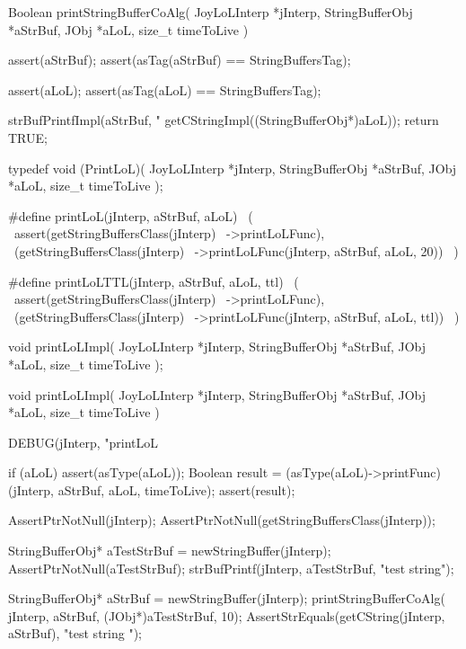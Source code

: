 \startCCode
Boolean printStringBufferCoAlg(
  JoyLoLInterp    *jInterp,
  StringBufferObj *aStrBuf,
  JObj            *aLoL,
  size_t           timeToLive
) {
  assert(aStrBuf);
  assert(asTag(aStrBuf) == StringBuffersTag);
  
  assert(aLoL);
  assert(asTag(aLoL) == StringBuffersTag);

  strBufPrintfImpl(aStrBuf, "%
    getCStringImpl((StringBufferObj*)aLoL));
  return TRUE;
}
\stopCCode

\startCHeader
typedef void (PrintLoL)(
  JoyLoLInterp    *jInterp,
  StringBufferObj *aStrBuf,
  JObj            *aLoL,
  size_t           timeToLive
);

#define printLoL(jInterp, aStrBuf, aLoL)          \ 
  (                                               \
    assert(getStringBuffersClass(jInterp)         \
      ->printLoLFunc),                            \
    (getStringBuffersClass(jInterp)               \
      ->printLoLFunc(jInterp, aStrBuf, aLoL, 20)) \
  )

#define printLoLTTL(jInterp, aStrBuf, aLoL, ttl)    \ 
  (                                                 \
    assert(getStringBuffersClass(jInterp)           \
      ->printLoLFunc),                              \
    (getStringBuffersClass(jInterp)                 \
      ->printLoLFunc(jInterp, aStrBuf, aLoL, ttl))  \
  )
\stopCHeader

\setCHeaderStream{private}
\startCHeader
void printLoLImpl(
  JoyLoLInterp    *jInterp,
  StringBufferObj *aStrBuf,
  JObj            *aLoL,
  size_t           timeToLive
);
\stopCHeader
{}

\startCCode
void printLoLImpl(
  JoyLoLInterp    *jInterp,
  StringBufferObj *aStrBuf,
  JObj            *aLoL,
  size_t           timeToLive
) {
  DEBUG(jInterp, "printLoL %

  if (aLoL) {
    assert(asType(aLoL));
    Boolean result =
      (asType(aLoL)->printFunc)
        (jInterp, aStrBuf, aLoL, timeToLive);
    assert(result);
  }
}
\stopCCode
{}

\startCTest
  AssertPtrNotNull(jInterp);
  AssertPtrNotNull(getStringBuffersClass(jInterp));

  StringBufferObj* aTestStrBuf = newStringBuffer(jInterp);
  AssertPtrNotNull(aTestStrBuf);
  strBufPrintf(jInterp, aTestStrBuf, "test string");
  
  StringBufferObj* aStrBuf = newStringBuffer(jInterp);
  printStringBufferCoAlg(
    jInterp, aStrBuf, (JObj*)aTestStrBuf, 10);
  AssertStrEquals(getCString(jInterp, aStrBuf), "test string ");
  
